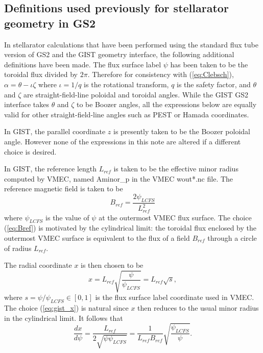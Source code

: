 \documentclass[11pt,letter]{article}
\begin{document}
\subsection{Definitions used previously for stellarator geometry in GS2}

In stellarator calculations that have been performed using the standard flux tube version of GS2
and the GIST geometry interface,
the following additional definitions have been made. 
The flux surface label $\psi$ has been taken to be the toroidal flux divided by $2\pi$.
Therefore for consistency with (\ref{eq:Clebsch}),
$\alpha = \theta - \iota \zeta$ where $\iota = 1/q$ is the rotational transform,
$q$ is the safety factor, and $\theta$ and $\zeta$ are straight-field-line poloidal and toroidal angles.
While the GIST GS2 interface takes $\theta$ and $\zeta$ to be Boozer
angles, all the expressions below are equally valid for other straight-field-line angles such as PEST or Hamada coordinates.

In GIST, the parallel coordinate $z$ is presently taken to be the Boozer poloidal angle. However none of the expressions in this note are altered if a different choice is desired.

In GIST, the reference length $L_{ref}$ is taken to be the effective minor radius computed by VMEC, named Aminor\_p in
the VMEC wout*.nc file.
The reference magnetic field is taken to be
\begin{equation}
B_{ref} = \frac{2 \psi_{LCFS}}{L_{ref}^2}
\label{eq:Bref}
\end{equation}
where $\psi_{LCFS}$ is the value of $\psi$ at the outermost VMEC flux surface. The choice (\ref{eq:Bref}) is
motivated by the cylindrical limit: the toroidal flux enclosed by the outermost VMEC surface is equivalent to the flux of a field $B_{ref}$ through a circle of radius $L_{ref}$.



The radial coordinate $x$ is then chosen to be
\begin{equation}
x = L_{ref} \sqrt{\frac{\psi}{\psi_{LCFS}}} = L_{ref} \sqrt{s},
\label{eq:gist_x}
\end{equation}
where $s = \psi / \psi_{LCFS} \in [0,1]$ is the flux surface label coordinate
used in VMEC. 
The choice (\ref{eq:gist_x}) is natural since 
$x$ then reduces to the usual minor radius in the cylindrical limit.
It follows that
\begin{equation}
\frac{dx}{d\psi} = \frac{L_{ref}}{2 \sqrt{ \psi \psi_{LCFS}}}
= \frac{1}{L_{ref} B_{ref}} \sqrt{ \frac{\psi_{LCFS}}{\psi}}.
\label{eq:psi_x_conversion}
\end{equation}
\end{document}
